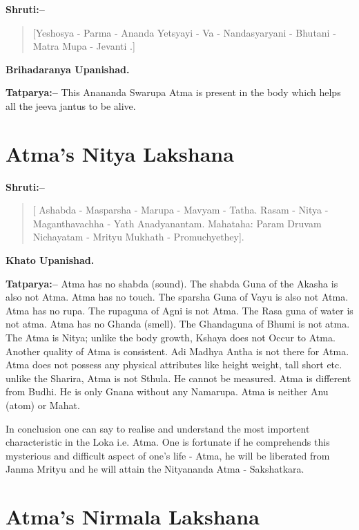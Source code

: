 \textbf{Shruti:–}

\begin{verse}
[Yeshosya - Parma - Ananda  Yetsyayi - Va - Nandasyaryani - Bhutani - Matra Mupa - Jevanti .]
\end{verse}

\begin{flushright}
\textbf{Brihadaranya Upanishad.}
\end{flushright}

\textbf{Tatparya:–} This Anananda Swarupa Atma is present in the body which helps all the jeeva jantus to be alive.

\chapter{Atma's Nitya Lakshana}

\textbf{Shruti:–}

\begin{verse}
[ Ashabda - Masparsha - Marupa - Mavyam - Tatha. Rasam - Nitya - Maganthavachha - Yath  Anadyanantam. Mahataha: Param Druvam Nichayatam - Mrityu Mukhath - Promuchyethey].
\end{verse}

\begin{flushright}
\textbf{Khato Upanishad.}
\end{flushright}

\textbf{Tatparya:–} Atma has no shabda (sound). The shabda Guna of the Akasha is also not Atma. Atma has no touch. The sparsha Guna of Vayu is also not Atma. Atma has no rupa. The rupaguna of Agni is not Atma. The Rasa guna of water is not atma. Atma has no Ghanda (smell). The Ghandaguna of Bhumi is not atma. The Atma is Nitya; unlike the body growth, Kshaya does not Occur to Atma. Another quality of Atma is consistent. Adi Madhya Antha is not there for Atma. Atma does not possess any physical attributes like height weight, tall short etc. unlike the Sharira, Atma is not Sthula. He cannot be measured. Atma is different from Budhi. He is only Gnana without any Namarupa. Atma is neither Anu (atom) or Mahat.

In conclusion one can say to realise and understand the most importent characteristic in the Loka i.e. Atma. One is fortunate if he comprehends this mysterious and difficult aspect of one's life - Atma, he will be liberated from Janma Mrityu and he will attain the Nityananda Atma - Sakshatkara.

\chapter{Atma's Nirmala Lakshana}

